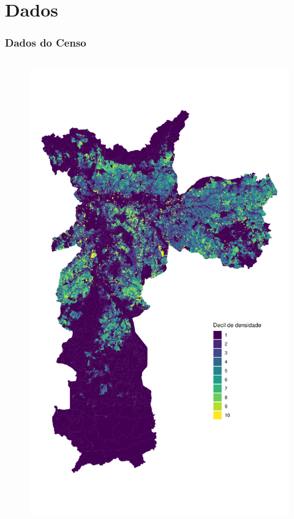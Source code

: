 \documentclass[aspectratio=169]{beamer}
\begin{document}
\section{Dados}

\begin{frame}
    \frametitle{Dados do Censo}
    \begin{columns}
        \begin{figure}
            \centering
            \includegraphics[height=.95\textheight]{imagens/mapa.pdf}
        \end{figure}


\end{columns}
\end{frame}
\end{document}
